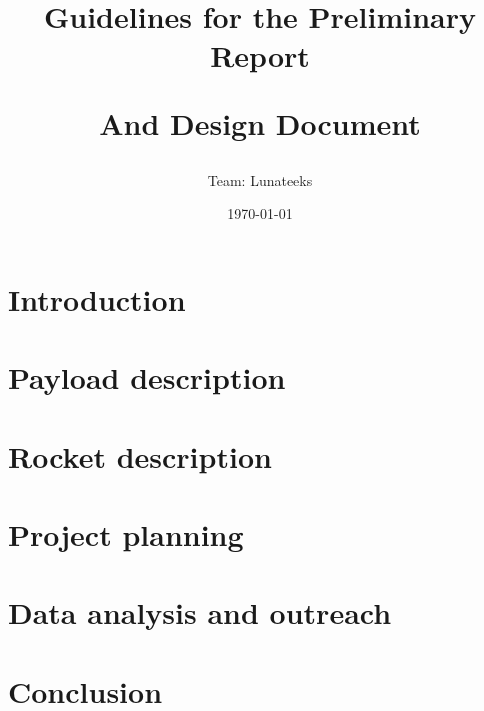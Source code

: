 \documentclass[11pt]{article}
\title{Guidelines for the Preliminary Report

And Design Document
}
\author{Team: Lunateeks}
\date{\today}
\begin{document}
\cansattitle

\tableofcontents
\pagestyle{plain}

\newpage

\section{Introduction}



\section{Payload description}



\section{Rocket description}



\section{Project planning}



\section{Data analysis and outreach}



\section{Conclusion}




\end{document}
